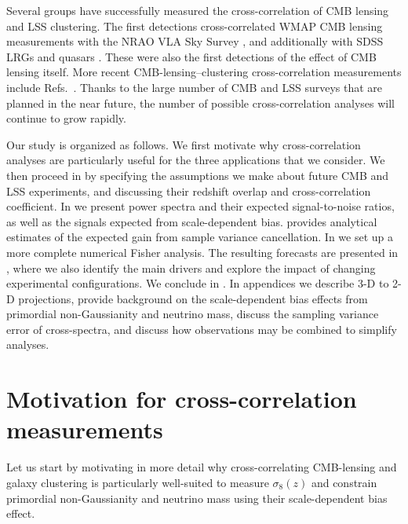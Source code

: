 \documentclass[prd,superscriptaddress,floatfix,notitlepage,nofootinbib,reprint]{revtex4-1} %
\begin{document}
Several groups have successfully measured the cross-correlation of CMB lensing and LSS clustering.
The first detections cross-correlated 
WMAP CMB lensing measurements with the NRAO VLA Sky Survey \cite{2007PhRvD..76d3510S}, and additionally with SDSS LRGs and quasars \cite{2008PhRvD..78d3520H}. 
These were also the first detections of the effect of CMB lensing itself.
More recent CMB-lensing--clustering cross-correlation measurements include Refs.~\cite{Bleem1203Xcorr,Sherwin1207QuasarsCMBlensing,Planck13Lensing,Giannantonio:2013kqa,Bianchini1410,Omori:2015qda,Giannantonio:2015ahz,Kuntz1510,Liu1601,Baxter:2016ziy,Singh1606,Nicola1612}.
Thanks to the large number of CMB and LSS surveys that are planned in the near future, the number of possible cross-correlation analyses will continue to grow rapidly. 



Our study is organized as follows. 
We first motivate why cross-correlation analyses are particularly useful for the three applications that we consider.
We then proceed in  by specifying the assumptions we make about future CMB and LSS experiments, and discussing their redshift overlap and cross-correlation coefficient.
In  we present power spectra and their expected signal-to-noise ratios, as well as the signals expected from scale-dependent bias.
 provides analytical estimates of the expected gain from sample variance cancellation.
In  we set up a more complete numerical Fisher analysis.
The resulting forecasts are presented in , where we also identify the main drivers and explore the impact of changing experimental configurations.
We conclude in .
In appendices we describe 3-D to 2-D projections, provide background on the scale-dependent bias effects from primordial non-Gaussianity and neutrino mass, discuss the sampling variance error of cross-spectra, and discuss how observations may be combined to simplify analyses.



\section{Motivation for cross-correlation measurements}

\label{se:XCorrelMotivation}
Let us start by motivating in more detail why cross-correlating CMB-lensing and galaxy clustering is particularly well-suited to measure $\sigma_8(z)$ and constrain primordial non-Gaussianity and neutrino mass using their scale-dependent bias effect.
\end{document}
